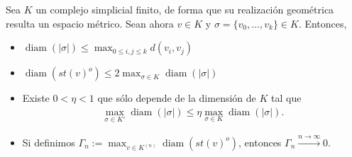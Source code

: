 \documentclass[11pt]{article}
\newcommand{\tint}[1]{#1^o}%
\newcommand{\diam}[1]{\operatorname{diam}(#1)}
\newcommand{\paint}[2]{\color{#1}{#2}}
\newenvironment{lemma}[2][Lema]{\begin{trivlist}
\item[\hskip \labelsep \paint{grey-light-blue}{{\bfseries #1}}\hskip \labelsep {\bfseries #2.}]}{\end{trivlist}}
\begin{document}
\begin{lemma}{3} Sea $K$ un complejo simplicial finito, de forma que su realizaci\'on geom\'etrica resulta un espacio m\'etrico. Sean ahora $v \in K$ y $\sigma = \{v_0, \dots, v_k\} \in K$. Entonces,
\begin{itemize}
\item[a)] $\diam{|\sigma|} \leq \max_{0 \leq i,j \leq k}d(v_i,v_j)$
\item[b)] $\diam{\tint{st(v)}} \leq 2\max_{\sigma \in K}\diam{|\sigma|}$
\item[c)] Existe $0 < \eta < 1$ que s\'olo depende de la dimensi\'on de $K$ tal que
\begin{align*}
\max_{\sigma \in K'}\diam{|\sigma|} \leq \eta \max_{\sigma \in K}\diam{|\sigma|}.
\end{align*}
\item[d)] Si definimos $\Gamma_n := \max_{v \in K^{(n)}}\diam{\tint{st(v)}}$, entonces $\Gamma_n \xrightarrow{n \to \infty} 0$.
\end{itemize}
\end{lemma}
\end{document}
